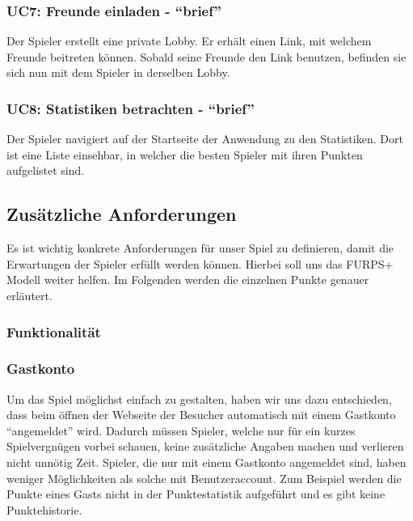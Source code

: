 \documentclass[11pt,ngerman]{article}
\newcommand{\quotes}[1]{``#1''}
\begin{document}
    \subsubsection{UC7: Freunde einladen - \quotes{brief}}
    \label{sssec:UC7Freundeeinladen}
    \begin{tcolorbox}[enhanced, breakable, sharp corners, width=\dimexpr\textwidth-15mm\relax ,enlarge left by=10mm ,fontupper=\linespread{1.1}\selectfont, boxrule=1pt, title={UC7: Freunde einladen}, colback=white, colframe=gray!22, coltitle=black]
    	Der Spieler erstellt eine private Lobby. Er erhält einen Link, mit welchem Freunde beitreten können.\newline
    	Sobald seine Freunde den Link benutzen, befinden sie sich nun mit dem Spieler in derselben Lobby.
    \end{tcolorbox}

    \subsubsection{UC8: Statistiken betrachten - \quotes{brief}}
    \label{sssec:UC8Statistikenbetrachten}
    \begin{tcolorbox}[enhanced, breakable, sharp corners, width=\dimexpr\textwidth-15mm\relax ,enlarge left by=10mm ,fontupper=\linespread{1.1}\selectfont, boxrule=1pt, title={UC8: Statistiken betrachten}, colback=white, colframe=gray!22, coltitle=black]
    	Der Spieler navigiert auf der Startseite der Anwendung zu den Statistiken. Dort ist eine Liste einsehbar, in welcher die besten Spieler mit ihren Punkten aufgelistet sind.
    \end{tcolorbox}

    \subsection{Zusätzliche Anforderungen}
    Es ist wichtig konkrete Anforderungen für unser Spiel zu definieren, damit die Erwartungen der Spieler erfüllt werden können. Hierbei soll uns das FURPS+ Modell weiter helfen. Im Folgenden werden die einzelnen Punkte genauer erläutert.
    \subsubsection{Funktionalität}
    \subsubsection{Gastkonto}
    Um das Spiel möglichst einfach zu gestalten, haben wir uns dazu entschieden, dass beim öffnen der Webseite der Besucher automatisch mit einem Gastkonto \quotes{angemeldet} wird. Dadurch müssen Spieler, welche nur für ein kurzes Spielvergnügen vorbei schauen, keine zusätzliche Angaben machen und verlieren nicht unnötig Zeit. Spieler, die nur mit einem Gastkonto angemeldet sind, haben weniger Möglichkeiten als solche mit Benutzeraccount. Zum Beispiel werden die Punkte eines Gasts nicht in der Punktestatistik aufgeführt und es gibt keine Punktehistorie.
\end{document}
